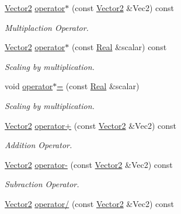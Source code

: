 \begin{DoxyCompactItemize}
\hyperlink{classMezzanine_1_1Vector2}{Vector2} \hyperlink{classMezzanine_1_1Vector2_aee38ccddf8fac68406b2b5ea479a8332}{operator$\ast$} (const \hyperlink{classMezzanine_1_1Vector2}{Vector2} \&Vec2) const 
\begin{DoxyCompactList}\small\item\em Multiplaction Operator. \item\end{DoxyCompactList}\item 
\hyperlink{classMezzanine_1_1Vector2}{Vector2} \hyperlink{classMezzanine_1_1Vector2_a310d2690ca671c81dc58c571479ee004}{operator$\ast$} (const \hyperlink{namespaceMezzanine_a726731b1a7df72bf3583e4a97282c6f6}{Real} \&scalar) const 
\begin{DoxyCompactList}\small\item\em Scaling by multiplication. \item\end{DoxyCompactList}\item 
void \hyperlink{classMezzanine_1_1Vector2_a47d00c3847a59f726ffa6a0a99a372c8}{operator$\ast$=} (const \hyperlink{namespaceMezzanine_a726731b1a7df72bf3583e4a97282c6f6}{Real} \&scalar)
\begin{DoxyCompactList}\small\item\em Scaling by multiplication. \item\end{DoxyCompactList}\item 
\hyperlink{classMezzanine_1_1Vector2}{Vector2} \hyperlink{classMezzanine_1_1Vector2_a232c79761cfd97aef96999732cda0acc}{operator+} (const \hyperlink{classMezzanine_1_1Vector2}{Vector2} \&Vec2) const 
\begin{DoxyCompactList}\small\item\em Addition Operator. \item\end{DoxyCompactList}\item 
\hyperlink{classMezzanine_1_1Vector2}{Vector2} \hyperlink{classMezzanine_1_1Vector2_a8311974bf9b4f65e2a43f3cb6d2b32b0}{operator-\/} (const \hyperlink{classMezzanine_1_1Vector2}{Vector2} \&Vec2) const 
\begin{DoxyCompactList}\small\item\em Subraction Operator. \item\end{DoxyCompactList}\item 
\hyperlink{classMezzanine_1_1Vector2}{Vector2} \hyperlink{classMezzanine_1_1Vector2_a2c956fc7eafffba4c0f707b240e113a8}{operator/} (const \hyperlink{classMezzanine_1_1Vector2}{Vector2} \&Vec2) const 

\end{DoxyCompactItemize}
